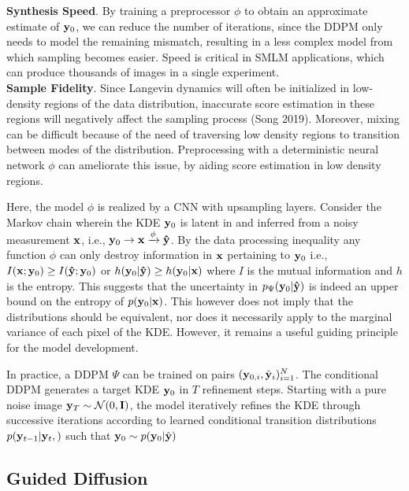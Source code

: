 \documentclass{article}
\begin{document}
\textbf{Synthesis Speed}. By training a preprocessor $\phi$ to obtain an approximate estimate of $\bold{y}_{0}$, we can reduce the number of iterations, since the DDPM only needs to model the remaining mismatch, resulting in a less complex model from which sampling becomes easier. Speed is critical in SMLM applications, which can produce thousands of images in a single experiment.\\

\textbf{Sample Fidelity}. Since Langevin dynamics will often be initialized in low-density regions of the data distribution, inaccurate score estimation in these regions will negatively affect the sampling process (Song 2019). Moreover, mixing can be difficult because of the need of traversing low density regions to transition between modes of the distribution. Preprocessing with a deterministic neural network $\phi$ can ameliorate this issue, by aiding score estimation in low density regions. 

Here, the model $\phi$ is realized by a CNN with upsampling layers. Consider the Markov chain wherein the KDE $\bold{y}_{0}$ is latent in and inferred from a noisy measurement $\bold{x}$, i.e., $\bold{y}_{0}\rightarrow \bold{x} \xrightarrow[]{\phi}\bold{\hat{y}}$. By the data processing inequality any function $\phi$ can only destroy information in $\bold{x}$ pertaining to $\bold{y}_{0}$ i.e., $I(\bold{x};\bold{y}_0) \geq I(\bold{\hat{y}};\bold{y}_0)$ or $h(\bold{y}_0|\bold{\hat{y}}) \geq h(\bold{y}_0|\bold{x})$ where $I$ is the mutual information and $h$ is the entropy. This suggests that the uncertainty in $p_{\Psi}(\bold{y}_0|\bold{\hat{y}})$ is indeed an upper bound on the entropy of $p(\bold{y}_0|\bold{x})$. This however does not imply that the distributions should be equivalent, nor does it necessarily apply to the marginal variance of each pixel of the KDE. However, it remains a useful guiding principle for the model development.

In practice, a DDPM $\Psi$ can be trained on pairs $(\bold{y}_{0,i},\hat{\bold{y}}_{i})_{i=1}^{N}$. The conditional DDPM generates a target KDE $\bold{y}_0$ in $T$ refinement steps. Starting with a pure noise image $\bold{y}_{T}\sim \mathcal{N}(0,\bold{I})$, the model iteratively refines the KDE through successive iterations according to learned conditional transition distributions $p(\bold{y}_{t-1}|\bold{y}_{t},\bold{})$ such that $\bold{y}_{0} \sim p(\bold{y}_0|\hat{\bold{y}})$ 

\subsection{Guided Diffusion}
\end{document}
